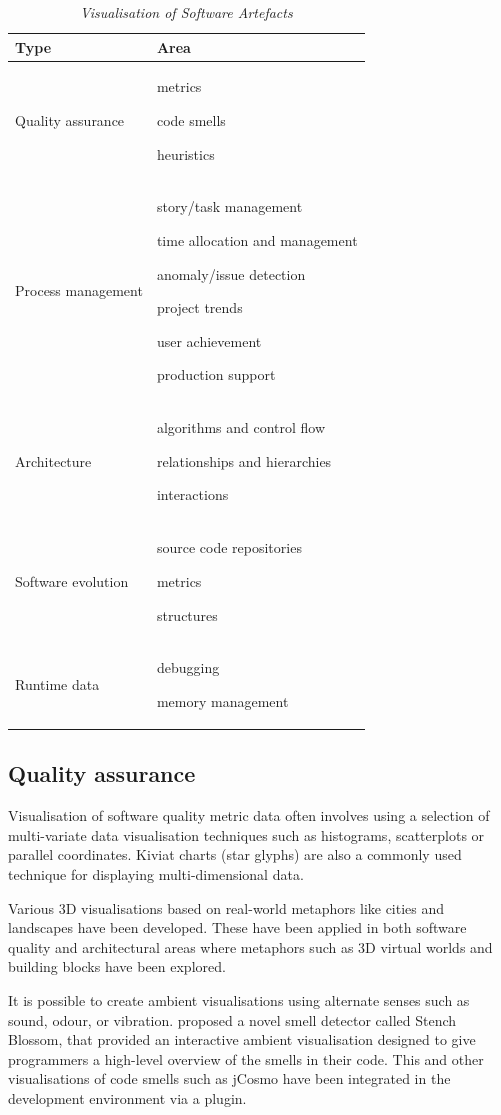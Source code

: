 \begin{table}
\centering
\caption{\textit{Visualisation of Software Artefacts}}
\begin{tabular}{|p{6cm}|p{6cm}|} \hline
\textbf{Type}&\textbf{Area}\\ \hline
Quality assurance & metrics\par code smells\par heuristics \\ \hline
Process management & story/task management\par time allocation and management\par anomaly/issue detection\par project trends\par user achievement\par production support \\ \hline
Architecture & algorithms and control flow\par relationships and hierarchies\par interactions\par \\ \hline
Software evolution & source code repositories\par metrics\par structures \\ \hline
Runtime data & debugging\par memory management \\
\hline\end{tabular}
\label{table:softwareartefacts}
\end{table}

\subsection{Quality assurance}\label{sect:qualityassurance}
 
Visualisation of software quality metric data often involves using a selection of multi-variate data visualisation techniques such as histograms, scatterplots or parallel coordinates. Kiviat charts (star glyphs) are also a commonly used technique for displaying multi-dimensional data.

Various 3D visualisations based on real-world metaphors like cities and landscapes have been developed. These have been applied in both software quality and architectural areas \citep[such as][]{irwin03, alam07} where metaphors such as 3D virtual worlds and building blocks have been explored.

It is possible to create ambient visualisations using alternate senses such as sound, odour, or vibration. \citet{murphyhill10} proposed a novel smell detector called Stench Blossom, that provided an interactive ambient visualisation designed to give programmers a high-level overview of the smells in their code. This and other visualisations of code smells such as jCosmo \citep{emden02} have been integrated in the development environment via a plugin.

